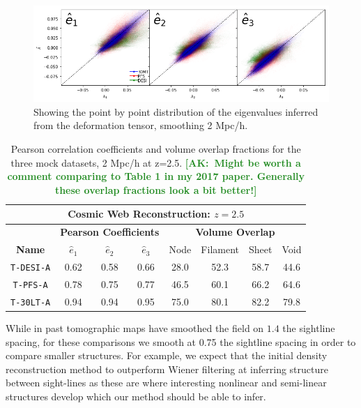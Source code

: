 \documentclass[times]{aastex62}
\newcommand{\ak}[1]{\noindent \textcolor{ForestGreen}{{\bf [AK:~{#1}]}}}
\begin{document}
\begin{figure}
  \centering 
  
  \includegraphics[trim=1cm 0cm 0cm 0cm,width=1.0\textwidth]{./figs_treepm/eigenvalues_z=2.png}
    \caption{Showing the point by point distribution of the eigenvalues inferred from the deformation tensor, smoothing 2 Mpc/h.} 
    \label{fig_eigenvalues}
\end{figure}

\begin{table}
  \begin{center}
    \label{tab:table1}
    \begin{tabular}{c||c|c|c||c|c|c|c} 
    
\multicolumn{8}{c}{\textbf{Cosmic Web Reconstruction: $z=2.5$}}
 \\ 
          \hline
      \hline

& \multicolumn{3}{|c}{\textbf{Pearson Coefficients}} & \multicolumn{4}{||c}{\textbf{Volume Overlap}} 
 \\ 
      \hline
      \textbf{Name}& $\hat{e}_1$ &  $\hat{e}_2$ & $\hat{e}_3$ & Node & Filament & Sheet & Void\\
      \hline
      \hline


        \texttt{T-DESI-A} & 0.62 & 0.58 & 0.66 & 28.0 & 52.3 & 58.7 & 44.6\\
        \texttt{T-PFS-A}& 0.78 & 0.75 & 0.77 & 46.5 & 60.1 & 66.2 & 64.6 \\
        \texttt{T-30LT-A} & 0.94 & 0.94 & 0.95 & 75.0 & 80.1 & 82.2 & 79.8\\
    \end{tabular}
        \caption{Pearson correlation coefficients and volume overlap fractions for the three mock datasets, 2 Mpc/h at z=2.5.
        \ak{Might be worth a comment comparing to Table 1 in my 2017 paper.  Generally these overlap fractions look a bit better!}}

  \end{center}
\end{table}

While in past tomographic maps \cite{Lee2017} have smoothed the field on $1.4$ the sightline spacing, for these comparisons we smooth at 0.75 the sightline spacing in order to compare smaller structures. For example, we expect that the initial density reconstruction method to outperform Wiener filtering at inferring structure between sight-lines as these are where interesting nonlinear and semi-linear structures develop which our method should be able to infer. 
\end{document}
